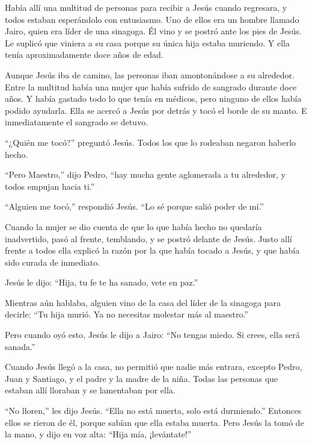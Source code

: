  Había allí una multitud de personas para recibir a Jesús
cuando regresara, y todos estaban esperándolo con entusiasmo.
 Uno de ellos era un hombre llamado Jairo, quien era líder
de una sinagoga. Él vino y se postró ante los pies de Jesús. Le suplicó
que viniera a su casa  porque su única hija estaba
muriendo. Y ella tenía aproximadamente doce años de edad.

Aunque Jesús iba de camino, las personas iban amontonándose a su
alrededor.  Entre la multitud había una mujer que había
sufrido de sangrado durante doce años. Y había gastado todo lo que tenía
en médicos, pero ninguno de ellos había podido ayudarla. 
Ella se acercó a Jesús por detrás y tocó el borde de su manto. E
inmediatamente el sangrado se detuvo.

 ``¿Quién me tocó?'' preguntó Jesús. Todos los que lo
rodeaban negaron haberlo hecho.

``Pero Maestro,'' dijo Pedro, ``hay mucha gente aglomerada a tu
alrededor, y todos empujan hacia ti.''

 ``Alguien me tocó,'' respondió Jesús. ``Lo sé porque salió
poder de mí.''

 Cuando la mujer se dio cuenta de que lo que había hecho no
quedaría inadvertido, pasó al frente, temblando, y se postró delante de
Jesús. Justo allí frente a todos ella explicó la razón por la que había
tocado a Jesús, y que había sido curada de inmediato.

 Jesús le dijo: ``Hija, tu fe te ha sanado, vete en paz.''

 Mientras aún hablaba, alguien vino de la casa del líder de
la sinagoga para decirle: ``Tu hija murió. Ya no necesitas molestar más
al maestro.''

 Pero cuando oyó esto, Jesús le dijo a Jairo: ``No tengas
miedo. Si crees, ella será sanada.''

 Cuando Jesús llegó a la casa, no permitió que nadie más
entrara, excepto Pedro, Juan y Santiago, y el padre y la madre de la
niña.  Todas las personas que estaban allí lloraban y se
lamentaban por ella.

``No lloren,'' les dijo Jesús. ``Ella no está muerta, solo está
durmiendo.''  Entonces ellos se rieron de él, porque sabían
que ella estaba muerta.  Pero Jesús la tomó de la mano, y
dijo en voz alta: ``Hija mía, ¡levántate!''

